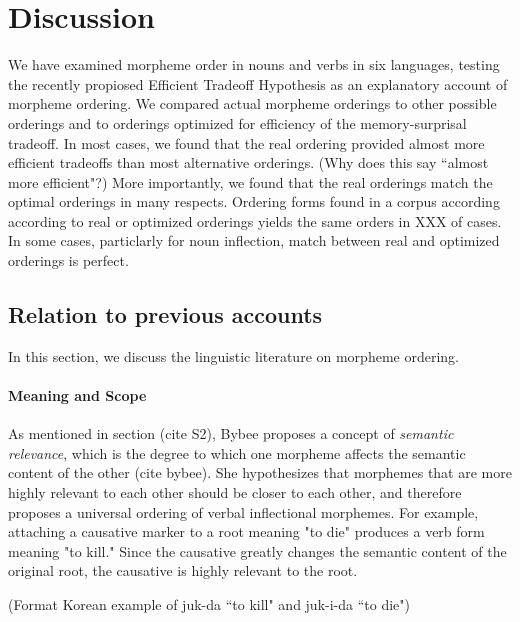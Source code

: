 \documentclass[11pt,letterpaper]{article}
\newcommand\becky[1]{{\color{blue}(#1)}}
\begin{document}
\section{Discussion}

We have examined morpheme order in nouns and verbs in six languages, testing the recently propiosed Efficient Tradeoff Hypothesis \citep{hahn2020modeling} as an explanatory account of morpheme ordering.
We compared actual morpheme orderings to other possible orderings and to orderings optimized for efficiency of the memory-surprisal tradeoff.
In most cases, we found that the real ordering provided almost more efficient tradeoffs than most alternative orderings. \becky{Why does this say ``almost more efficient"?}
More importantly, we found that the real orderings match the optimal orderings in many respects.
Ordering forms found in a corpus according according to real or optimized orderings yields the same orders in XXX of cases.
In some cases, particlarly for noun inflection, match between real and optimized orderings is perfect.

\subsection{Relation to previous accounts}


In this section, we discuss the linguistic literature on morpheme ordering.

\paragraph{Meaning and Scope}
As mentioned in section \becky{cite S2}, Bybee proposes a concept of \textit{semantic relevance}, which is the degree to which one morpheme affects the semantic content of the other \becky{cite bybee}. She hypothesizes that morphemes that are more highly relevant to each other should be closer to each other, and therefore proposes a universal ordering of verbal inflectional morphemes. For example, attaching a causative marker to a root meaning "to die" produces a verb form meaning "to kill." Since the causative greatly changes the semantic content of the original root, the causative is highly relevant to the root. 

\becky{Format Korean example of juk-da ``to kill" and juk-i-da ``to die"}
\end{document}
